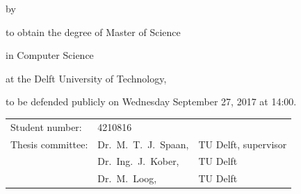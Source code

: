 \begin{titlepage}


\begin{center}


{\makeatletter
\largetitlestyle\fontsize{28}{94}\selectfont\@title										%
\makeatother}

{\makeatletter
\ifx\@subtitle\undefined\else
    \bigskip
   {\tudsffamily\fontsize{22}{32}\selectfont\@subtitle}    
\fi
\makeatother}

%
%

%
%
%
%
%
%
%
%
%
%
%
%
%
%
%
%


\bigskip
\bigskip

by

\bigskip
\bigskip

{\makeatletter
\largetitlestyle\fontsize{20}{26}\selectfont\@author
\makeatother}

\bigskip
\bigskip

to obtain the degree of Master of Science 

in Computer Science

at the Delft University of Technology,

to be defended publicly on Wednesday September 27, 2017 at 14:00.

\vfill

\begin{tabular}{lll}
    Student number: & 4210816 \\
    Thesis committee: & Dr.\ M.\ T.\ J.\ Spaan, & TU Delft, supervisor \\
        & Dr.\ Ing.\ J.\ Kober, & TU Delft \\												%
        & Dr.\ M.\ Loog, & TU Delft 											%
\end{tabular}


\end{center}
\end{titlepage}
